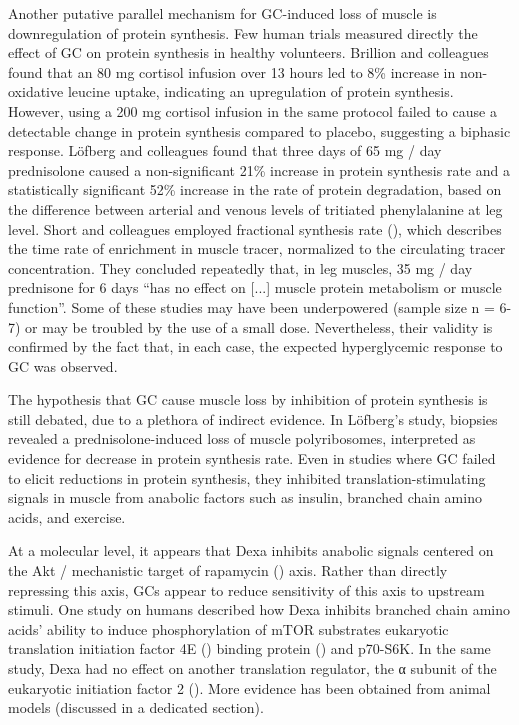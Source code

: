 \documentclass[12pt,english]{report}\usepackage[]{graphicx}\usepackage[]{color}
\begin{document}
Another putative parallel mechanism for GC-induced loss of muscle
is downregulation of protein synthesis. Few human trials measured
directly the effect of GC on protein synthesis in healthy volunteers.
Brillion and colleagues\citep{brillon1995effect} found that an 80
mg cortisol infusion over 13 hours led to 8\% increase in non-oxidative
leucine uptake, indicating an upregulation of protein synthesis. However,
using a 200 mg cortisol infusion in the same protocol failed to cause
a detectable change in protein synthesis compared to placebo, suggesting
a biphasic response. Löfberg and colleagues\citep{lofberg2002effects}
found that three days of 65 mg / day prednisolone caused a non-significant
21\% increase in protein synthesis rate and a statistically significant
52\% increase in the rate of protein degradation, based on the difference
between arterial and venous levels of tritiated phenylalanine at leg
level. Short and colleagues employed fractional synthesis rate (),
which describes the time rate of enrichment in muscle tracer, normalized
to the circulating tracer concentration. They concluded repeatedly
that, in leg muscles, 35 mg / day prednisone for 6 days ``has no
effect on {[}...{]} muscle protein metabolism or muscle function''\citep{short2004effect,short2009short-term}.
Some of these studies may have been underpowered (sample size n =
6-7) or may be troubled by the use of a small dose. Nevertheless,
their validity is confirmed by the fact that, in each case, the expected
hyperglycemic response to GC was observed. 

The hypothesis that GC cause muscle loss by inhibition of protein
synthesis is still debated, due to a plethora of indirect evidence.
In Löfberg's study, biopsies revealed a prednisolone-induced loss
of muscle polyribosomes, interpreted as evidence for decrease in protein
synthesis rate. Even in studies where GC failed to elicit reductions
in protein synthesis, they inhibited translation-stimulating signals
in muscle from anabolic factors such as insulin\citep{louard1994glucocorticoids},
branched chain amino acids\citep{liu2001branched}, and exercise\citep{garrel1988effects}.

At a molecular level, it appears that Dexa inhibits anabolic signals
centered on the Akt / mechanistic target of rapamycin ()
axis. Rather than directly repressing this axis, GCs appear to reduce
sensitivity of this axis to upstream stimuli. One study on humans
described how Dexa inhibits branched chain amino acids' ability to
induce phosphorylation of mTOR substrates eukaryotic translation initiation
factor 4E ()
binding protein () and
p70-S6K\citep{liu2004glucocorticoids}. In the same study, Dexa had
no effect on another translation regulator, the α subunit of the eukaryotic
initiation factor 2 ().
More evidence has been obtained from animal models (discussed in a
dedicated section). 
\end{document}

